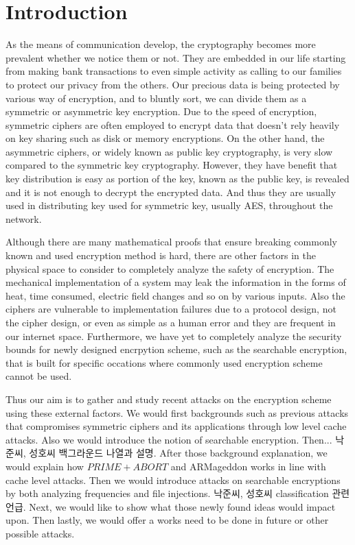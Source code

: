 \documentclass[a4paper]{article}
\begin{document}
\section{Introduction}

As the means of communication develop, the cryptography becomes more prevalent whether we notice them or not. They are embedded in our life starting from making bank transactions to even simple activity as calling to our families to protect our privacy from the others. Our precious data is being protected by various way of encryption, and to bluntly sort, we can divide them as a symmetric or asymmetric key encryption. Due to the speed of encryption, symmetric ciphers are often employed to encrypt data that doesn't rely heavily on key sharing such as disk or memory encryptions. On the other hand, the asymmetric ciphers, or widely known as public key cryptography, is very slow compared to the symmetric key cryptography. However, they have benefit that key distribution is easy as portion of the key, known as the public key, is revealed and it is not enough to decrypt the encrypted data. And thus they are usually used in distributing key used for symmetric key, usually AES, throughout the network.
\par Although there are many mathematical proofs that ensure breaking commonly known and used encryption method is hard, there are other factors in the physical space to consider to completely analyze the safety of encryption. The mechanical implementation of a system may leak the information in the forms of heat, time consumed, electric field changes and so on by various inputs. Also the ciphers are vulnerable to implementation failures due to a protocol design, not the cipher design, or even as simple as a human error and they are frequent in our internet space. Furthermore, we have yet to completely analyze the security bounds for newly designed encrpytion scheme, such as the searchable encryption, that is built for specific occations where commonly used encryption scheme cannot be used.
\par Thus our aim is to gather and study recent attacks on the encryption scheme using these external factors. We would first backgrounds such as previous attacks that compromises symmetric ciphers and its applications through low level cache attacks. Also we would introduce the notion of searchable encryption. Then... 낙준씨, 성호씨 백그라운드 나열과 설명. After those background explanation, we would explain how $PRIME+ABORT$ and ARMageddon works in line with cache level attacks. Then we would introduce attacks on searchable encryptions by both analyzing frequencies and file injections. 낙준씨, 성호씨 classification 관련 언급. Next, we would like to show what those newly found ideas would impact upon. Then lastly, we would offer a works need to be done in future or other possible attacks.
\end{document}
